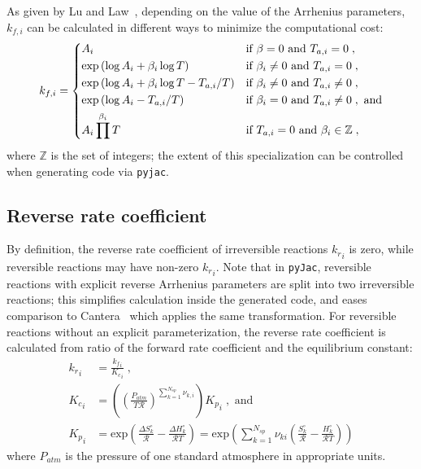 \documentclass[12pt]{article}
\newcommand{\ns}{\ensuremath{{N_{sp}}}}
\newcommand{\Ru}{\ensuremath{\mathcal{R}}}
\begin{document}
As given by Lu and Law~\cite{Lu:2009gh}, depending on the value of the Arrhenius parameters, $k_{f,i}$ can be calculated in different ways to minimize the computational cost:
\begin{equation}
  k_{f,i} =
  \begin{dcases}
  A_i & \text{if } \beta = 0 \text{ and } T_{a,i} = 0 \;, \\
  \exp \left( \log A_i + \beta_i \log T \right)   & \text{if } \beta_i \neq 0 \text{ and } T_{a, i} = 0 \;, \\
  \exp \left( \log A_i + \beta_i \log T - T_{a, i} / T \right) & \text{if } \beta_i \neq 0 \text{ and } T_{a, i} \neq 0 \;, \\
  \exp \left( \log A_i - T_{a, i} / T \right)  & \text{if } \beta_i = 0 \text{ and } T_{a, i} \neq 0 \;, \text{ and} \\
  A_i \prod^{\beta_i} T & \text{if } T_{a, i} = 0 \text{ and } \beta_i \in \mathbb{Z} \;,
  \end{dcases}
\end{equation}
where $\mathbb{Z}$ is the set of integers; the extent of this specialization can be controlled when generating code via \texttt{pyjac}.

\subsection{Reverse rate coefficient}
By definition, the reverse rate coefficient of irreversible reactions ${k_r}_{i}$ is zero, while reversible reactions may have non-zero ${k_r}_{i}$.
Note that in \texttt{pyJac}, reversible reactions with explicit reverse Arrhenius parameters are split into two irreversible reactions; this simplifies calculation inside the generated code, and eases comparison to Cantera~\cite{Goodwin:2015aa} which applies the same transformation.
For reversible reactions without an explicit parameterization, the reverse rate coefficient is calculated from ratio of the forward rate coefficient and the equilibrium constant:
\begin{align}
 {k_r}_{i} &= \frac{{k_f}_{i}}{{K_c}_{i}}\; , \label{e:kr}\\
 {K_c}_{i} &= \left(\left(\frac{P_{atm}}{T \Ru}\right)^{\sum_{k=1}^{\ns} \nu_{k,i}}\right) {K_p}_{i}\; ,\text{ and} \label{e:kc}\\
 {K_p}_{i} &= \text{exp}\left(\frac{\Delta S^{\circ}_k}{\Ru} - \frac{\Delta H^{\circ}_k}{\Ru T}\right) = \text{exp}\left(\sum_{k=1}^{\ns}\nu_{ki}\left(\frac{S^{\circ}_k}{\Ru} - \frac{H^{\circ}_k}{\Ru T}\right)\right) \label{e:kp}
\end{align}
where $P_{atm}$ is the pressure of one standard atmosphere in appropriate units.
\end{document}
